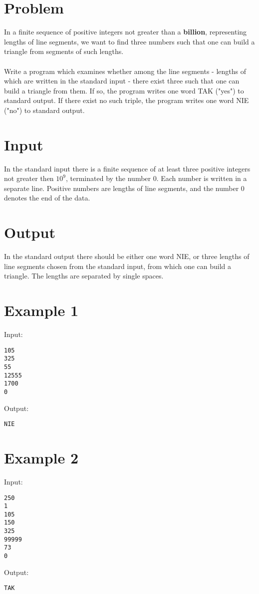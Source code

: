 \documentclass[11pt]{article}
\begin{document}
\section*{Problem}
In a finite sequence of positive integers not greater than a \textbf{billion},
representing lengths of line segments, we want to find three numbers such that
one can build a triangle from segments of such lengths.
\\\\
Write a program which examines whether among the line segments - lengths of
which are written in the standard input - there exist three such that one can
build a triangle from them. If so, the program writes one word TAK ("yes") to
standard output. If there exist no such triple, the program writes one word NIE
("no") to standard output.
\section*{Input}
In the standard input there is a finite sequence of at least three positive
integers not greater then $10^9$, terminated by the number $0$. Each number is
written in a separate line. Positive numbers are lengths of line segments, and
the number $0$ denotes the end of the data.
\section*{Output}
In the standard output there should be either one word NIE, or three lengths of
line segments chosen from the standard input, from which one can build a
triangle. The lengths are separated by single spaces.
\section*{Example 1}
Input:

\begin{verbatim}
105
325
55
12555
1700
0
\end{verbatim}

\noindent Output:

\begin{verbatim}
NIE
\end{verbatim}
\section*{Example 2}
Input:

\begin{verbatim}
250
1
105
150
325
99999
73
0
\end{verbatim}

\noindent Output:

\begin{verbatim}
TAK
\end{verbatim}
\end{document}
